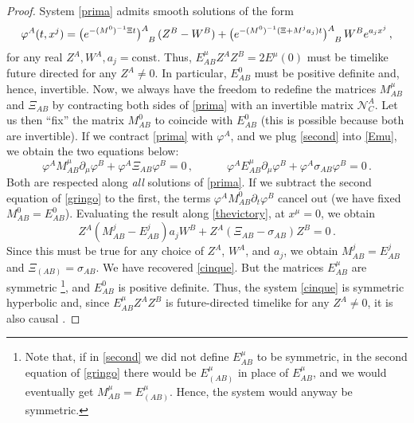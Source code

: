 \documentclass[aps,prl,singlecolumn,nofootinbib]{revtex4-2}
\newcommand{\spc}{\quad \quad \quad}
\theoremstyle{definition}
\theoremstyle{theorem}
\begin{document}
\begin{proof}
System \eqref{prima} admits smooth solutions of the form
\begin{equation}\label{thevictory}
    \varphi^A(t,x^j)=  \big(e^{-(M^0)^{-1} \Xi t} \big)\indices{^A_B} \, (Z^B-W^B) 
    + \big(e^{-(M^0)^{-1} (\Xi+M^j a_j) t} \big)\indices{^A_B} \, W^Be^{a_j x^j} \, , 
\end{equation}
for any real $Z^A,W^A,a_j=\text{const}$. Thus, $E^\mu_{AB}Z^AZ^B= 2E^\mu(0)$ must be timelike future directed for any $Z^A \neq 0$. In particular, $E^0_{AB}$ must be positive definite and, hence, invertible. Now, we always have the freedom to redefine the matrices $M^\mu_{AB}$ and $\Xi_{AB}$ by contracting both sides of \eqref{prima} with an invertible matrix $\mathcal{N}^A_C$. Let us then ``fix'' the matrix $M^0_{AB}$ to coincide with $E^0_{AB}$ (this is possible because both are invertible). If we contract \eqref{prima} with $\varphi^A$, and we plug \eqref{second} into \eqref{Emu}, we obtain the two equations below:
\begin{equation}\label{gringo}
\varphi^A M^\mu_{AB}\partial_\mu \varphi^B + \varphi^A \Xi_{AB} \varphi^B =0 \, , \spc  \varphi^A E^\mu_{AB} \partial_\mu \varphi^B + \varphi^A \sigma_{AB} \varphi^B =0 \, . 
\end{equation}
Both are respected along \textit{all} solutions of \eqref{prima}. If we subtract the second equation of \eqref{gringo} to the first, the terms $\varphi^A M^0_{AB}\partial_t \varphi^B$ cancel out (we have fixed $M^0_{AB}=E^0_{AB}$). Evaluating the result along \eqref{thevictory}, at $x^\mu=0$, we obtain
\begin{equation}\label{MjjjEjjj}
Z^A(M^j_{AB}-E^j_{AB})a_j W^B +Z^A (\Xi_{AB}- \sigma_{AB} ) Z^B =0 \, .
\end{equation}
Since this must be true for any choice of $Z^A$, $W^A$, and $a_j$, we obtain $M^j_{AB}=E^j_{AB}$ and $\Xi_{(AB)}= \sigma_{AB}$. We have recovered \eqref{cinque}. But the matrices $E^\mu_{AB}$ are symmetric \footnote{Note that, if in \eqref{second} we did not define $E^\mu_{AB}$ to be symmetric, in the second equation of \eqref{gringo} there would be $E^\mu_{(AB)}$ in place of $E^\mu_{AB}$, and we would eventually get $M^\mu_{AB}=E^\mu_{(AB)}$. Hence, the system would anyway be symmetric.}, and $E^0_{AB}$ is positive definite. Thus, the system \eqref{cinque} is symmetric hyperbolic and, since $E^\mu_{AB}Z^AZ^B$ is future-directed timelike for any $Z^A \neq 0$, it is also causal \cite{Geroch_Lindblom_1991_causal}.
\end{proof}
\end{document}
